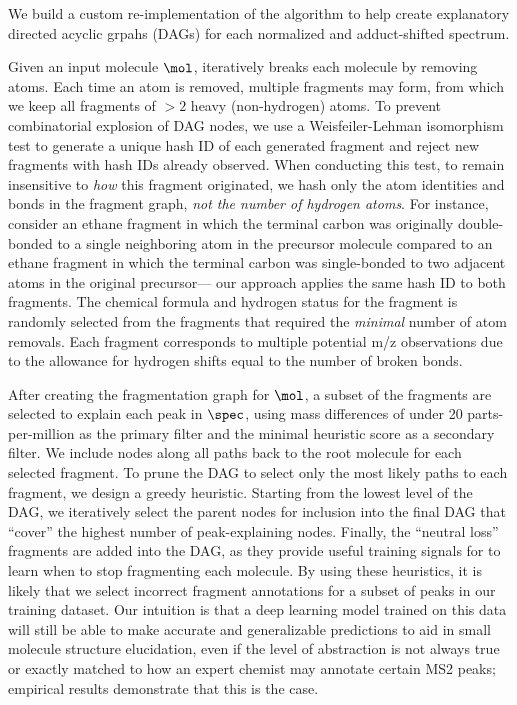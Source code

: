 \documentclass[journal=jcim,manuscript=article]{achemso}
\begin{document}
We build a custom re-implementation of the \MAGMA algorithm \cite{ridder_automatic_2014} to help create explanatory directed acyclic grpahs (DAGs) for each normalized and adduct-shifted spectrum. 

Given an input molecule $\mol$, \MAGMA iteratively breaks each molecule by removing atoms. Each time an atom is removed, multiple fragments may form, from which we keep all fragments of $>2$ heavy (non-hydrogen) atoms. To prevent combinatorial explosion of DAG nodes, we use a Weisfeiler-Lehman isomorphism test \cite{weisfeiler1968reduction} to generate a unique hash ID of each generated fragment and reject new fragments with hash IDs already observed. When conducting this test, to remain insensitive to \emph{how} this fragment originated, we hash only the atom identities and bonds in the fragment graph, \emph{not the number of hydrogen atoms}. For instance, consider an ethane fragment in which the terminal carbon was originally double-bonded to a single neighboring atom in the precursor molecule compared to an ethane fragment in which the terminal carbon was single-bonded to two adjacent atoms in the original precursor--- our approach applies the same hash ID to both fragments. The chemical formula and hydrogen status for the fragment is randomly selected from the fragments that required the \textit{minimal} number of atom removals. Each fragment corresponds to multiple potential m/z observations due to the allowance for hydrogen shifts equal to the number of broken bonds.

After creating the fragmentation graph for $\mol$, a subset of the fragments are selected to explain each peak in $\spec$, using mass differences of under 20 parts-per-million as the primary filter and the minimal \MAGMA heuristic score as a secondary filter. We include nodes along all paths back to the root molecule for each selected fragment. To prune the DAG to select only the most likely paths to each fragment, we design a greedy heuristic. Starting from the lowest level of the DAG, we iteratively select the parent nodes for inclusion into the final DAG that ``cover'' the highest number of peak-explaining nodes. Finally, the ``neutral loss'' fragments are added into the DAG, as they provide useful training signals for \ourModel \ourModelOneShort to learn when to stop fragmenting each molecule. By using these heuristics, it is likely that we select incorrect fragment annotations for a subset of peaks in our training dataset. Our intuition is that a deep learning model trained on this data will still be able to make accurate and generalizable predictions to aid in small molecule structure elucidation, even if the level of abstraction is not always true or exactly matched to how an expert chemist may annotate certain MS2 peaks; empirical results demonstrate that this is the case.
\end{document}

